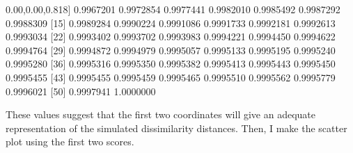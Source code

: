 \documentclass[
]{article}
\newenvironment{Shaded}{\begin{snugshade}}{\end{snugshade}}
\newcommand{\AttributeTok}[1]{\textcolor[rgb]{0.77,0.63,0.00}{#1}}
\newcommand{\DecValTok}[1]{\textcolor[rgb]{0.00,0.00,0.81}{#1}}
\newcommand{\ErrorTok}[1]{\textcolor[rgb]{0.64,0.00,0.00}{\textbf{#1}}}
\newcommand{\FloatTok}[1]{\textcolor[rgb]{0.00,0.00,0.81}{#1}}
\newcommand{\FunctionTok}[1]{\textcolor[rgb]{0.00,0.00,0.00}{#1}}
\newcommand{\NormalTok}[1]{#1}
\newcommand{\OtherTok}[1]{\textcolor[rgb]{0.56,0.35,0.01}{#1}}
\newcommand{\SpecialCharTok}[1]{\textcolor[rgb]{0.00,0.00,0.00}{#1}}
\newcommand{\StringTok}[1]{\textcolor[rgb]{0.31,0.60,0.02}{#1}}
\begin{document}
\begin{Shaded}
\begin{Highlighting}[]
\NormalTok{ [}\DecValTok{8}\NormalTok{] }\FloatTok{0.9967201} \FloatTok{0.9972854} \FloatTok{0.9977441} \FloatTok{0.9982010} \FloatTok{0.9985492} \FloatTok{0.9987292} \FloatTok{0.9988309}
\NormalTok{[}\DecValTok{15}\NormalTok{] }\FloatTok{0.9989284} \FloatTok{0.9990224} \FloatTok{0.9991086} \FloatTok{0.9991733} \FloatTok{0.9992181} \FloatTok{0.9992613} \FloatTok{0.9993034}
\NormalTok{[}\DecValTok{22}\NormalTok{] }\FloatTok{0.9993402} \FloatTok{0.9993702} \FloatTok{0.9993983} \FloatTok{0.9994221} \FloatTok{0.9994450} \FloatTok{0.9994622} \FloatTok{0.9994764}
\NormalTok{[}\DecValTok{29}\NormalTok{] }\FloatTok{0.9994872} \FloatTok{0.9994979} \FloatTok{0.9995057} \FloatTok{0.9995133} \FloatTok{0.9995195} \FloatTok{0.9995240} \FloatTok{0.9995280}
\NormalTok{[}\DecValTok{36}\NormalTok{] }\FloatTok{0.9995316} \FloatTok{0.9995350} \FloatTok{0.9995382} \FloatTok{0.9995413} \FloatTok{0.9995443} \FloatTok{0.9995450} \FloatTok{0.9995455}
\NormalTok{[}\DecValTok{43}\NormalTok{] }\FloatTok{0.9995455} \FloatTok{0.9995459} \FloatTok{0.9995465} \FloatTok{0.9995510} \FloatTok{0.9995562} \FloatTok{0.9995779} \FloatTok{0.9996021}
\NormalTok{[}\DecValTok{50}\NormalTok{] }\FloatTok{0.9997941} \FloatTok{1.0000000}
\end{Highlighting}
\end{Shaded}

These values suggest that the first two coordinates will give an
adequate representation of the simulated dissimilarity distances. Then,
I make the scatter plot using the first two scores.

\begin{Shaded}
\end{Shaded}
\end{document}
